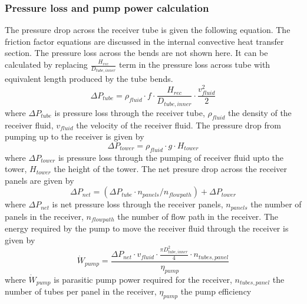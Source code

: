 \subsubsection{Pressure loss and pump power calculation}
The pressure drop across the receiver tube is given the following equation. The friction factor equations are discussed in the internal convective heat transfer section. The pressure loss across the bends are not shown here. It can be calculated by replacing $ \frac{H_{rec}}{D_{tube,inner}} $ term in the pressure loss across tube with equivalent length produced by the tube bends.
\begin{equation}
\Delta P_{tube}=\rho_{fluid} \cdot f\cdot \frac{H_{rec}}{D_{tube,inner}} \cdot \frac{v_{fluid}^2}{2}
\end{equation}
where $\Delta P_{tube}$ is pressure loss through the receiver tube, $\rho_{fluid}$ the density of the receiver fluid, $v_{fluid}$ the velocity of the receiver fluid. The pressure drop from pumping up to the receiver is given by
\begin{equation}
\Delta P_{tower}=\rho_{fluid}\cdot g \cdot H_{tower}
\end{equation}
where $\Delta P_{tower}$ is pressure loss through the pumping of receiver fluid upto the tower, $H_{tower}$ the height of the tower. The net presure drop across the receiver panels are given by 
\begin{equation}
\Delta P_{net}=(\Delta P_{tube}\cdot  n_{panels}/n_{flow path})+\Delta P_{tower}
\end{equation}
where $\Delta P_{net}$ is net pressure loss through the receiver panels, $n_{panels}$ the number of panels in the receiver, $n_{flow path}$ the number of flow path in the receiver. The energy required by the pump to move the receiver fluid through the receiver is given by
\begin{equation}
\dot W_{pump}= \frac {\Delta P_{net}\cdot v_{fluid}\cdot \frac {\pi D_{tube,inner}^2}{4}\cdot n_{tubes,panel}}{\eta_{pump}}
\end{equation}
where $\dot W_{pump}$ is parasitic pump power required for the receiver, $n_{tubes,panel}$ the number of tubes per panel in the receiver, $\eta_{pump}$ the pump efficiency \\
